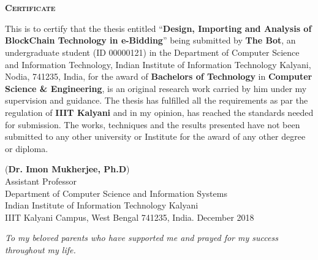 \documentclass[a4paper,12pt]{report}
\newenvironment{dedication}
  {\clearpage           %
   \thispagestyle{empty}%
   \vspace*{\stretch{1}}%
   \itshape             %
   \centering          %
  }
  {\par %
   \vspace{\stretch{3}} %
   \clearpage           %
  }
\begin{document}
\chapter*{}
\setcounter{page}{1} 
\begin{center}
\textbf{\textsc{\Large Certificate}}\\[0.75cm]
\end{center}
\onehalfspacing This is to certify that the thesis entitled
``\textbf{Design, Importing and Analysis of BlockChain Technology in e-Bidding}'' being submitted by \textbf{The Bot}, an undergraduate student (ID 00000121) in the Department of Computer Science and Information Technology, Indian Institute of Information Technology Kalyani, Nodia, 741235, India, for the award of \textbf{Bachelors of Technology} in \textbf{Computer Science \& Engineering}, is an original research work carried by him under my supervision and guidance. The thesis has fulfilled all the requirements as par the regulation of \textbf{IIIT Kalyani} and in my opinion, has reached the standards needed for submission. The works, techniques and the results presented have not been submitted to any other university or Institute for the award of any other degree or diploma.\\
\bigskip
\bigskip
\bigskip
\bigskip
\bigskip
\bigskip
\bigskip
\begin{flushleft}
\bigskip
(\textbf{Dr. Imon Mukherjee, Ph.D})\\
\smallskip
Assistant Professor\\
Department of Computer Science and Information Systems\\
Indian Institute of Information Technology Kalyani\\
IIIT Kalyani Campus, West Bengal 741235, India.
December 2018\\
\end{flushleft}

\newpage
\begin{dedication}
\textit{To my beloved parents who have supported me and prayed for
my success\\ throughout my life.}
\end{dedication}
\end{document}
